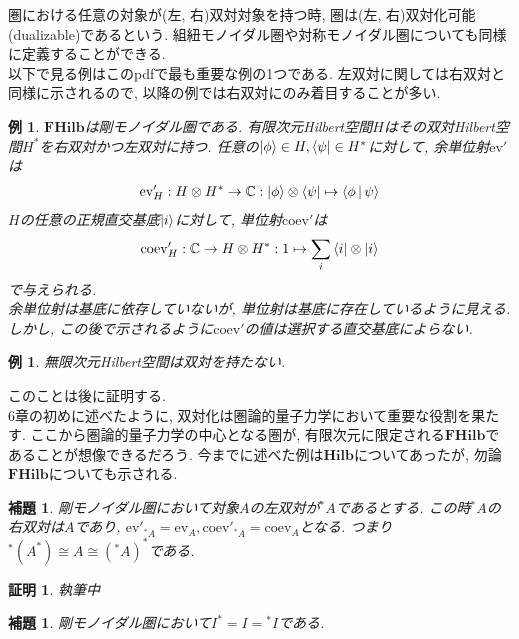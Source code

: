 \documentclass[a4paper,12pt]{ltjsarticle}
\theoremstyle{break}
\newtheorem{lem}[thm]{補題}
\newtheorem{eg}[thm]{例}
\newtheorem*{prf}{証明}
\newcommand{\hilb}{\mathbf{Hilb}}
\newcommand{\fhilb}{\mathbf{FHilb}}
\newcommand{\mbc}{\mathbb{C}}
\newcommand{\eva}{\mathrm{ev}}
\newcommand{\coev}{\mathrm{coev}}
\newcommand{\mt}{\mapsto}
\newcommand{\ot}{\otimes}
\numberwithin{equation}{section}
\begin{document}
圏における任意の対象が(左, 右)双対対象を持つ時, 圏は(左, 右)双対化可能(dualizable)であるという. 
組紐モノイダル圏や対称モノイダル圏についても同様に定義することができる. \\

以下で見る例はこのpdfで最も重要な例の1つである. 
左双対に関しては右双対と同様に示されるので, 以降の例では右双対にのみ着目することが多い. 

\begin{eg}
  $\fhilb$は剛モノイダル圏である. 
  有限次元Hilbert空間$H$はその双対Hilbert空間$H^*$を右双対かつ左双対に持つ.  
  任意の$\ket{\phi} \in H, \bra{\psi} \in H^*$に対して, 余単位射$\eva'$は
  \begin{align*}
    \eva'_H: H \ot H^* \to \mbc: \ket{\phi} \ot \bra{\psi} \mt \Braket{\phi|\psi}
  \end{align*}
  $H$の任意の正規直交基底$\ket{i}$に対して, 単位射$\coev'$は
  \begin{align*}
    \coev'_H: \mbc \to H \ot H^*: 1 \mt \sum_i \bra{i} \ot \ket{i}
  \end{align*}
  で与えられる. \\
  余単位射は基底に依存していないが, 単位射は基底に存在しているように見える. 
  しかし, この後で示されるように$\coev'$の値は選択する直交基底によらない. 
\end{eg}

\begin{eg}
  無限次元Hilbert空間は双対を持たない. 
\end{eg}

このことは後に証明する. \\

6章の初めに述べたように, 双対化は圏論的量子力学において重要な役割を果たす. 
ここから圏論的量子力学の中心となる圏が, 有限次元に限定される$\fhilb$であることが想像できるだろう. 
今までに述べた例は$\hilb$についてあったが, 勿論$\fhilb$についても示される. 

\begin{lem}
  剛モノイダル圏において対象$A$の左双対が${}^*A$であるとする. 
  この時${}^*A$の右双対は$A$であり, $\eva'_{{}^*A}=\eva_A, \coev'_{{}^*A}=\coev_A$となる.
  つまり${}^*(A^*) \cong A \cong ({}^*A)^*$である.  
\end{lem}

\begin{prf}
  執筆中
\end{prf}

\begin{lem}
  剛モノイダル圏において$I^*=I={}^*I$である. 
\end{lem}
\end{document}

